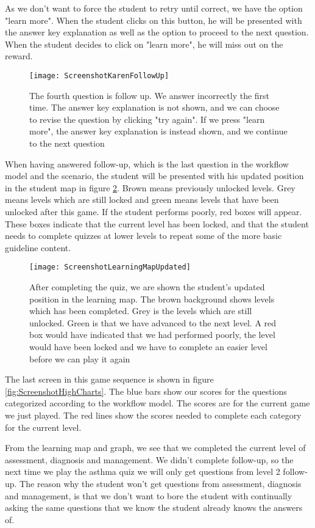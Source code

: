 As we don't want to force the student to retry until correct, we have the option "learn more". When the student clicks on this button, he will be presented with the answer key explanation as well as the option to proceed to the next question. When the student decides to click on "learn more", he will miss out on the reward.
\begin{figure}[h!]
	\caption {The fourth question is follow up. We answer incorrectly the first time. The answer key explanation is not shown, and we can choose to revise the question by clicking "try again". If we press "learn more", the answer key explanation is instead shown, and we continue to the next question}
	\label{fig:ScreenshotKarenFollowUp}
	\texttt{[image: ScreenshotKarenFollowUp]}
\end{figure}

When having answered follow-up, which is the last question in the workflow model and the scenario, the student will be presented with his updated position in the student map in figure \ref{fig:ScreenshotLearningMapUpdated}. Brown means previously unlocked levels. Grey means levels which are still locked and green means levels that have been unlocked after this game. If the student performs poorly, red boxes will appear. These boxes indicate that the current level has been locked, and that the student needs to complete quizzes at lower levels to repeat some of the more basic guideline content.

\begin{figure}[h!]
	\caption {After completing the quiz, we are shown the student's updated position in the learning map. The brown background shows levels which has been completed. Grey is the levels which are still unlocked. Green is that we have advanced to the next level. A red box would have indicated that we had performed poorly, the level would have been locked and we have to complete an easier level before we can play it again}
	\label{fig:ScreenshotLearningMapUpdated}
	\texttt{[image: ScreenshotLearningMapUpdated]}
\end{figure}

The last screen in this game sequence is shown in figure \ref{fig:ScreenshotHighCharts}. The blue bars show our scores for the questions categorized according to the workflow model. The scores are for the current game we just played. The red lines show the scores needed to complete each category for the current level.

From the learning map and graph, we see that we completed the current level of assessment, diagnosis and management. We didn't complete follow-up, so the next time we play the asthma quiz we will only get questions from level 2 follow-up. The reason why the student won't get questions from assessment, diagnosis and management, is that we don't want to bore the student with continually asking the same questions that we know the student already knows the answers of.

